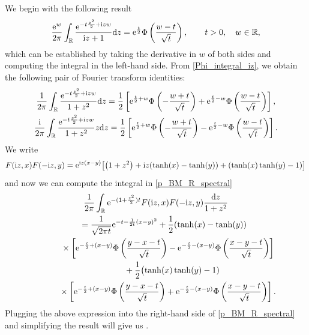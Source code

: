 \documentclass[10pt,a4paper]{amsart}
\numberwithin{equation}{section}
\theoremstyle{definition}
\def\r{{\mathbb R}}
\def\d{{\textnormal d}}
\def\i{{\textnormal i}}
\begin{document}
We begin with the following result
\begin{equation}
 \label{Phi_integral_iz}
 \frac{{\rm e}^{w}}{2\pi } \int_{\r} \frac{{\rm e}^{-t\frac{z^2}{2}+\i zw }}{\i z+1} \d z=
 {\rm e}^{\frac{t}{2}} \Phi\left(\frac{w-t}{\sqrt{t}}\right), \qquad t>0, \quad w\in \r,
\end{equation}
which can be established by taking the derivative in $w$ of both sides and computing the integral in the left-hand side. From
\eqref{Phi_integral_iz}, we obtain the following pair of Fourier transform identities:
\begin{gather}
 \frac{1}{2\pi} \int_{\r} \frac{{\rm e}^{- t \frac{z^2}2 + \i z w }}{1+z^2} \d z=
 \frac{1}{2} \left[ {\rm e}^{\frac{t}{2} + w} \Phi\left( - \frac{w+t}{\sqrt{t}}\right) +
 {\rm e}^{\frac{t}{2} - w} \Phi\left( \frac{w-t}{\sqrt{t}}\right)\right],\label{Fourier1}\\
 \frac{\i}{2\pi} \int_{\r} \frac{{\rm e}^{- t \frac{z^2}2 + \i z w }}{1+z^2} z \d z=
 \frac{1}{2} \left[ {\rm e}^{\frac{t}{2} + w} \Phi\left( - \frac{w+t}{\sqrt{t}}\right) -
 {\rm e}^{\frac{t}{2} - w} \Phi\left( \frac{w-t}{\sqrt{t}}\right)\right]. \label{Fourier2}
\end{gather}
We write
\[
F(\i z ,x) F(-\i z,y)={\rm e}^{\i z (x-y) }
\big[ \bigl(1+z^2\bigr) + \i z (\tanh(x)-\tanh(y))+(\tanh(x)\tanh(y)-1)\big]
\]
and now we can compute the integral in \eqref{p_BM_R_spectral}
\begin{gather*}
\frac{1}{2\pi} \int_{\r} {\rm e}^{- (1+\frac{z^2}{2})t}
F(\i z,x) F(-\i z, y) \frac{\d z}{1+z^2}\\
\qquad=\frac{1}{\sqrt{2\pi t}} {\rm e}^{-t-\frac{1}{2t}(x-y)^2} +\frac{1}{2} (\tanh(x)-\tanh(y))\\
\phantom{\qquad=}{}\times \left[ {\rm e}^{-\frac{t}{2} + (x-y)} \Phi\left( \frac{y-x-t}{\sqrt{t}}\right) -
 {\rm e}^{-\frac{t}{2} - (x-y)} \Phi\left( \frac{x-y-t}{\sqrt{t}}\right)\right]\\
\phantom{\qquad=\times}{}+\frac{1}{2} \bigl(\tanh(x) \tanh(y) -1)\\
\phantom{\qquad=}{}\times
\left[ {\rm e}^{-\frac{t}{2} + (x-y)} \Phi\left( \frac{y-x-t}{\sqrt{t}}\right) +
 {\rm e}^{-\frac{t}{2} - (x-y)} \Phi\left( \frac{x-y-t}{\sqrt{t}}\right)\right].
\end{gather*}
Plugging the above expression into the right-hand side of \eqref{p_BM_R_spectral} and simplifying the result will give us .
\end{document}

